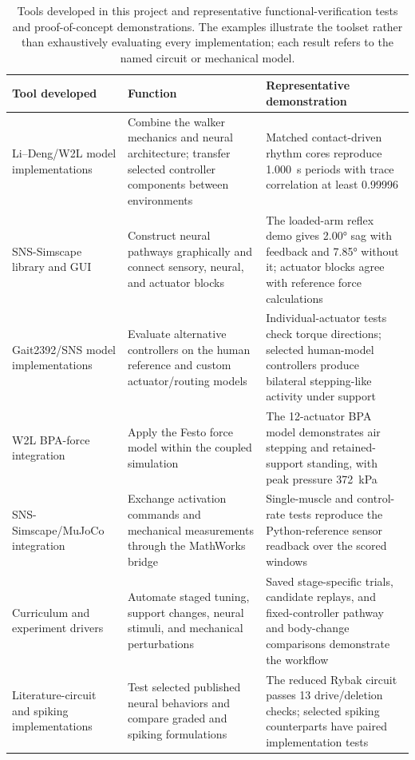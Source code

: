 \documentclass[12pt]{article}
\begin{document}
\begin{table}[htbp]
\caption[Tools developed and representative demonstrations]{Tools developed in this project and representative functional-verification tests and proof-of-concept demonstrations. The examples illustrate the toolset rather than exhaustively evaluating every implementation; each result refers to the named circuit or mechanical model.}
\label{tab:sns_capability}
\small
\begin{tabularx}{\textwidth}{@{}>{\raggedright\arraybackslash}p{}*{2}{>{\raggedright\arraybackslash}X}@{}}
\toprule
\textbf{Tool developed} & \textbf{Function} & \textbf{Representative demonstration} \\
\midrule
Li--Deng/W2L model implementations & Combine the walker mechanics and neural architecture; transfer selected controller components between environments & Matched contact-driven rhythm cores reproduce \qty{1.000}{\second} periods with trace correlation at least 0.99996 \\
SNS-Simscape library and GUI & Construct neural pathways graphically and connect sensory, neural, and actuator blocks & The loaded-arm reflex demo gives \ang{2.00} sag with feedback and \ang{7.85} without it; actuator blocks agree with reference force calculations \\
Gait2392/SNS model implementations & Evaluate alternative controllers on the human reference and custom actuator/routing models & Individual-actuator tests check torque directions; selected human-model controllers produce bilateral stepping-like activity under support \\
W2L BPA-force integration & Apply the Festo force model within the coupled simulation & The 12-actuator BPA model demonstrates air stepping and retained-support standing, with peak pressure \qty{372}{\kPa} \\
SNS-Simscape/MuJoCo integration & Exchange activation commands and mechanical measurements through the MathWorks bridge & Single-muscle and control-rate tests reproduce the Python-reference sensor readback over the scored windows \\
Curriculum and experiment drivers & Automate staged tuning, support changes, neural stimuli, and mechanical perturbations & Saved stage-specific trials, candidate replays, and fixed-controller pathway and body-change comparisons demonstrate the workflow \\
Literature-circuit and spiking implementations & Test selected published neural behaviors and compare graded and spiking formulations & The reduced Rybak circuit passes 13 drive/deletion checks; selected spiking counterparts have paired implementation tests \\
\bottomrule
\end{tabularx}
\end{table}
\end{document}
